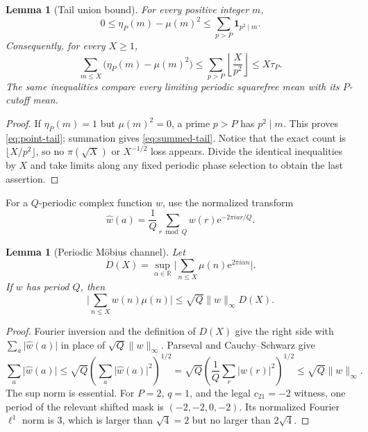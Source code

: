 \documentclass[11pt]{article}
\newtheorem{lemma}[theorem]{Lemma}
\theoremstyle{definition}
\theoremstyle{remark}
\newcommand{\mob}{\mu}
\newcommand{\e}{\mathrm e}
\newcommand{\abs}[1]{\lvert#1\rvert}
\newcommand{\norm}[1]{\lVert#1\rVert}
\begin{document}
\begin{lemma}[Tail union bound]
\label{lem:tail}
For every positive integer $m$,
\begin{equation}
 0\le\eta_P(m)-\mob(m)^2
 \le\sum_{p>P}\mathbf1_{p^2\mid m}.
 \label{eq:point-tail}
\end{equation}
Consequently, for every $X\ge1$,
\begin{equation}
 \sum_{m\le X}\bigl(\eta_P(m)-\mob(m)^2\bigr)
 \le\sum_{p>P}\left\lfloor\frac X{p^2}\right\rfloor
 \le X\tau_P.
 \label{eq:summed-tail}
\end{equation}
The same inequalities compare every limiting periodic squarefree mean with
its $P$-cutoff mean.
\end{lemma}

\begin{proof}
If $\eta_P(m)=1$ but $\mob(m)^2=0$, a prime $p>P$ has $p^2\mid m$.
This proves \eqref{eq:point-tail}; summation gives
\eqref{eq:summed-tail}.  Notice that the exact count is
$\lfloor X/p^2\rfloor$, so no $\pi(\sqrt X)$ or $X^{-1/2}$ loss appears.
Divide the identical inequalities by $X$ and take limits along any fixed
periodic phase selection to obtain the last assertion.
\end{proof}

For a $Q$-periodic complex function $w$, use the normalized transform
\begin{equation}
 \widehat w(a)=\frac1Q\sum_{r\bmod Q}w(r)\e^{-2\pi i ar/Q}.
 \label{eq:dft}
\end{equation}

\begin{lemma}[Periodic M\"obius channel]
\label{lem:fourier}
Let
\[
 D(X)=\sup_{\alpha\in\mathbb R}
       \abs{\sum_{n\le X}\mob(n)\e^{2\pi i\alpha n}}.
\]
If $w$ has period $Q$, then
\begin{equation}
 \abs{\sum_{n\le X}w(n)\mob(n)}
 \le\sqrt Q\norm{w}_\infty D(X).
 \label{eq:fourier-bound}
\end{equation}
\end{lemma}

\begin{proof}
Fourier inversion and the definition of $D(X)$ give the right side with
$\sum_a\abs{\widehat w(a)}$ in place of
$\sqrt Q\norm{w}_\infty$.  Parseval and Cauchy--Schwarz give
\[
 \sum_a\abs{\widehat w(a)}
 \le\sqrt Q\left(\sum_a\abs{\widehat w(a)}^2\right)^{1/2}
 =\sqrt Q\left(\frac1Q\sum_r\abs{w(r)}^2\right)^{1/2}
 \le\sqrt Q\norm{w}_\infty.
\]
The sup norm is essential.  For $P=2$, $q=1$, and the legal
$c_{21}=-2$ witness, one period of the relevant shifted mask is
$(-2,-2,0,-2)$.  Its normalized Fourier $\ell^1$ norm is $3$, which is
larger than $\sqrt4=2$ but no larger than $2\sqrt4$.
\end{proof}
\end{document}
